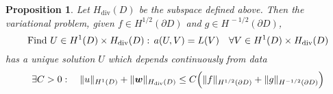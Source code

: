 \documentclass[10pt, a4paper, twoside, openright]{book}
\theoremstyle{definition}
\theoremstyle{plain}
\theoremstyle{plain}
\theoremstyle{plain}
\newtheorem{proposition}[subsection]{Proposition}
\theoremstyle{plain}
\theoremstyle{plain}
\theoremstyle{plain}
\theoremstyle{plain}
\theoremstyle{plain}
\DeclareMathOperator{\divergence}{div}
\begin{document}
\begin{proposition}
\label{prop:MITP-variational}
 Let $H_{\divergence}(D)$ be the subspace defined above. Then the variational problem, given $f\in H^{1/2}(\partial D)$ and $g\in H^{\,-1/2}(\partial D)$,
 \begin{equation}
 \label{eq:MITP-variational}
  \textup{Find }U\in H^1(D)\times H_{\divergence}(D):\,a(U,V)=L(V) \quad\forall V\in H^1(D)\times H_{\divergence}(D)
 \end{equation}
has a unique solution $U$ 
which depends continuously from data
\begin{equation}
 \exists C>0:\quad \|u\|_{H^1(D)} + \|\bm w\|_{H_{\divergence}(D)}\leq C\Bigl(\|f\|_{H^{1/2}(\partial D)}+\|g\|_{H^{-1/2}(\partial D)}\Bigr)
\end{equation}

\end{proposition}
\end{document}
